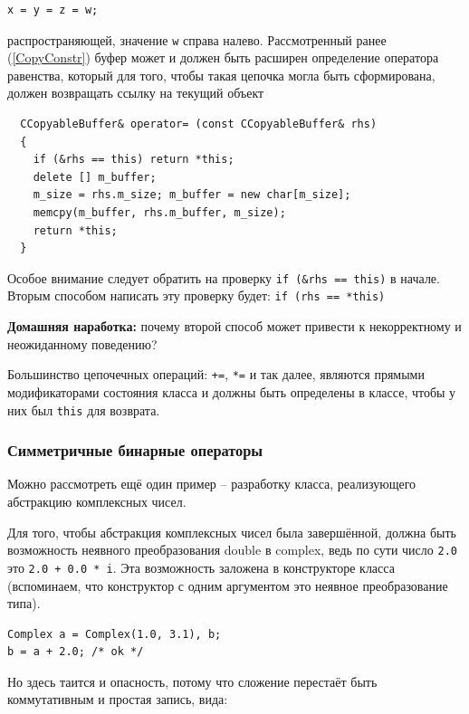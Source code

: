\documentclass[a4paper,12pt,oneside]{article}
\begin{document}
\begin{lstlisting}
x = y = z = w;
\end{lstlisting}

распространяющей, значение \lstinline!w! справа налево. Рассмотренный ранее (\ref{CopyConstr}) буфер может и должен быть расширен определение оператора равенства, который для того, чтобы такая цепочка могла быть сформирована, должен возвращать ссылку на текущий объект

\begin{lstlisting}
  CCopyableBuffer& operator= (const CCopyableBuffer& rhs)
  {
    if (&rhs == this) return *this;
    delete [] m_buffer;
    m_size = rhs.m_size; m_buffer = new char[m_size];
    memcpy(m_buffer, rhs.m_buffer, m_size);
    return *this;
  }
\end{lstlisting}

Особое внимание следует обратить на проверку \lstinline!if (&rhs == this)! в начале. Вторым способом написать эту проверку будет: \lstinline!if (rhs == *this)!

\textbf{Домашняя наработка:} почему второй способ может привести к некорректному и неожиданному поведению?

Большинство цепочечных операций: \lstinline!+=!, \lstinline!*=! и так далее, являются прямыми модификаторами состояния класса и должны быть определены в классе, чтобы у них был \lstinline!this! для возврата.

\subsubsection{Симметричные бинарные операторы}\label{SymmBinary}

Можно рассмотреть ещё один пример -- разработку класса, реализующего абстракцию комплексных чисел.

Для того, чтобы абстракция комплексных чисел была завершённой, должна быть возможность неявного преобразования double в complex, ведь по сути число \lstinline!2.0! это \lstinline!2.0 + 0.0 * i!. Эта возможность заложена в конструкторе класса (вспоминаем, что конструктор с одним аргументом это неявное преобразование типа).

\begin{lstlisting}
Complex a = Complex(1.0, 3.1), b;
b = a + 2.0; /* ok */
\end{lstlisting}

Но здесь таится и опасность, потому что сложение перестаёт быть коммутативным и простая запись, вида:
\end{document}
